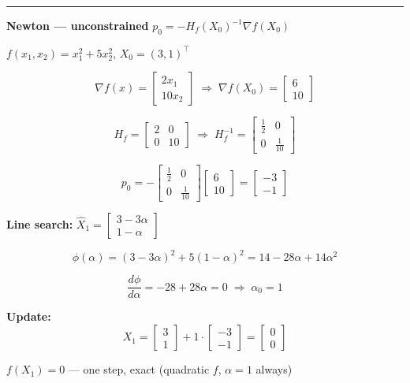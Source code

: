 \documentclass[10pt,a3paper]{article}
\begin{document}
\vspace{8pt}

\noindent\rule{\linewidth}{0.4pt}

\vspace{4pt}

\noindent
\begin{minipage}[t]{0.46\linewidth}
\textbf{Newton — unconstrained} \quad $p_0 = -H_f(X_0)^{-1}\nabla f(X_0)$

$f(x_1,x_2)=x_1^2+5x_2^2$,\; $X_0=(3,1)^\top$

\[
  \nabla f(x) = \begin{bmatrix}2x_1\\10x_2\end{bmatrix}
  \;\Rightarrow\;
  \nabla f(X_0) = \begin{bmatrix}6\\10\end{bmatrix}
\]

\[
  H_f = \begin{bmatrix}2&0\\0&10\end{bmatrix}
  \;\Rightarrow\;
  H_f^{-1} = \begin{bmatrix}\tfrac{1}{2}&0\\0&\tfrac{1}{10}\end{bmatrix}
\]

\[
  p_0 = -\begin{bmatrix}\tfrac{1}{2}&0\\0&\tfrac{1}{10}\end{bmatrix}
         \begin{bmatrix}6\\10\end{bmatrix}
       = \begin{bmatrix}-3\\-1\end{bmatrix}
\]

\textbf{Line search:} $\hat{X}_1 = \begin{bmatrix}3-3\alpha\\1-\alpha\end{bmatrix}$

\[
  \phi(\alpha) = (3-3\alpha)^2+5(1-\alpha)^2 = 14-28\alpha+14\alpha^2
\]

\[
  \frac{d\phi}{d\alpha}=-28+28\alpha=0 \;\Rightarrow\; \alpha_0=1
\]

\textbf{Update:}
\[
  X_1 = \begin{bmatrix}3\\1\end{bmatrix}+1\cdot\begin{bmatrix}-3\\-1\end{bmatrix}
      = \begin{bmatrix}0\\0\end{bmatrix}
\]

$f(X_1)=0$ — one step, exact (quadratic $f$, $\alpha=1$ always)

\end{minipage}\hfill
\end{document}
